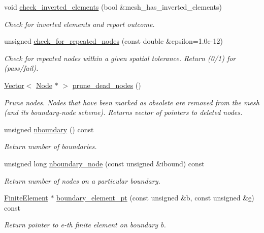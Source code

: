 \begin{DoxyCompactItemize}
void \hyperlink{classoomph_1_1Mesh_a5c95ee63b466247e6c57c38fb59c577c}{check\+\_\+inverted\+\_\+elements} (bool \&mesh\+\_\+has\+\_\+inverted\+\_\+elements)
\begin{DoxyCompactList}\small\item\em Check for inverted elements and report outcome. \end{DoxyCompactList}\item 
unsigned \hyperlink{classoomph_1_1Mesh_aa8229e193565c8de821170d482dfcee2}{check\+\_\+for\+\_\+repeated\+\_\+nodes} (const double \&epsilon=1.\+0e-\/12)
\begin{DoxyCompactList}\small\item\em Check for repeated nodes within a given spatial tolerance. Return (0/1) for (pass/fail). \end{DoxyCompactList}\item 
\hyperlink{classoomph_1_1Vector}{Vector}$<$ \hyperlink{classoomph_1_1Node}{Node} $\ast$ $>$ \hyperlink{classoomph_1_1Mesh_ac9f58929371a3f39dd646d2756547ad2}{prune\+\_\+dead\+\_\+nodes} ()
\begin{DoxyCompactList}\small\item\em Prune nodes. Nodes that have been marked as obsolete are removed from the mesh (and its boundary-\/node scheme). Returns vector of pointers to deleted nodes. \end{DoxyCompactList}\item 
unsigned \hyperlink{classoomph_1_1Mesh_a84543564d6babe4faacbb9d87043fc19}{nboundary} () const
\begin{DoxyCompactList}\small\item\em Return number of boundaries. \end{DoxyCompactList}\item 
unsigned long \hyperlink{classoomph_1_1Mesh_a034677ceb48c67769acb83f304c84f7d}{nboundary\+\_\+node} (const unsigned \&ibound) const
\begin{DoxyCompactList}\small\item\em Return number of nodes on a particular boundary. \end{DoxyCompactList}\item 
\hyperlink{classoomph_1_1FiniteElement}{Finite\+Element} $\ast$ \hyperlink{classoomph_1_1Mesh_a875271b6f162ddc5685a2511b35e75ec}{boundary\+\_\+element\+\_\+pt} (const unsigned \&b, const unsigned \&\hyperlink{cfortran_8h_a37cd013acc76697829c324bdd8562d82}{e}) const
\begin{DoxyCompactList}\small\item\em Return pointer to e-\/th finite element on boundary b. \end{DoxyCompactList}\item 

\end{DoxyCompactItemize}
